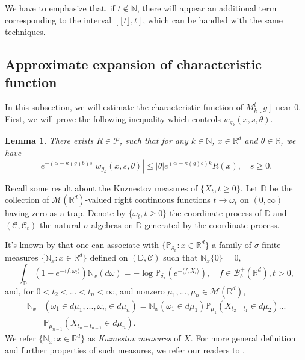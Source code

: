\documentclass{article}
\newtheorem{lemma}{Lemma}[section]
\begin{document}
{\color{red} We have to emphasize that, if $t\notin \mathbb{N}$, there will appear an additional term corresponding to the interval $[\lfloor t \rfloor,t]$, which can be handled with the same techniques.}
\subsection{Approximate expansion of characteristic function}

In this subsection, we will estimate the characteristic function of $M_k^t[g]$ near $0$. First, we will prove the following inequality which controls $w_{g_k}(x,s,\theta)$.
\begin{lemma}\label{lemma1}
There exists $R \in \mathcal{P}$, such that for any $k \in \mathbb{N}$, $x\in\mathbb{R}^d$ and $\theta\in \mathbb{R}$, we have
$$e^{-(\alpha-\kappa(g)b) s}|w_{g_k}(x,s,\theta)|\leq |\theta|e^{(\alpha-\kappa(g)b)k} R(x), \quad s\geq 0.$$
\end{lemma}
Recall some result about the Kuznestov measures of $\{X_t, t\geq 0\}$. Let $\mathbb{D}$ be the collection of $\mathcal{M}(\mathbb{R}^d)$-valued right continuous functions $t\rightarrow \omega_t$ on $(0,\infty)$ having zero as a trap. Denote by $\{\omega_t, t\geq0\}$ the coordinate process of $\mathbb{D}$ and
 $(\mathcal{C},\mathcal{C}_t)$ the natural $\sigma$-algebras on $\mathbb{D}$ generated by the coordinate process.

It's known by \cite[section 8.4]{ZL} that  one can associate with $\{\mathbb{P}_{\delta_x}:x\in\mathbb{R}^d\}$ a family of $\sigma$-finite measures $\{\mathbb{N}_x:x \in \mathbb{R}^d\}$ defined on $(\mathbb{D},\mathcal{C})$ such that $\mathbb{N}_x\{0\}=0$, 
\begin{equation}\label{Nmeasure}
   \int_{\mathbb{D}}(1-e^{-\langle f,\omega_t\rangle})\mathbb{N}_x(d\omega)=-\log \mathbb{P}_{\delta_x}(e^{-\langle f, X_t \rangle}), \quad f \in \mathcal{B}_b^+(\mathbb{R}^d), t>0,
\end{equation}
and, for $0<t_2<...<t_n<\infty$, and nonzero $\mu_1,...,\mu_n \in \mathcal{M}(\mathbb{R}^d)$,
\begin{align*}
    \mathbb{N}_x&\left(\omega_1\in d \mu_1,...,\omega_n \in d\mu_n\right)=\mathbb{N}_x(\omega_1\in d\mu_1)\mathbb{P}_{\mu_1}\left(X_{t_2-t_1}\in d \mu_2\right)...\\
    &\mathbb{P}_{\mu_{n-1}}\left(X_{t_n-t_{n-1}}\in d \mu_n\right).
\end{align*}
We refer $\{\mathbb{N}_x:x \in \mathbb{R}^d\}$ as {\em Kuznestov measures} of $X$. For more general definition and further properties of such measures, we refer our readers to \cite{ZL,DK}.
\end{document}
